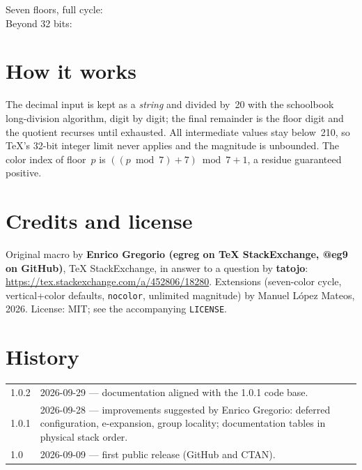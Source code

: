 \documentclass[11pt]{article}
\begin{document}
\begin{center}
\qquad
{}\qquad
{}\qquad
{}
\end{center}

\begin{center}
Seven floors, full cycle: \\[6pt]
Beyond 32 bits: 
\end{center}

\section{How it works}

The decimal input is kept as a \emph{string} and divided by~20 with the
schoolbook long-division algorithm, digit by digit; the final remainder is
the floor digit and the quotient recurses until exhausted. All intermediate
values stay below~210, so TeX's 32-bit integer limit never applies and the
magnitude is unbounded. The color index of floor~$p$ is
$((p \bmod 7)+7) \bmod 7 + 1$, a residue guaranteed positive.

\section{Credits and license}

Original macro by \textbf{Enrico Gregorio (egreg on TeX StackExchange, @eg9 on GitHub)}, TeX StackExchange, in answer to a question
by \textbf{tatojo}: \url{https://tex.stackexchange.com/a/452806/18280}.
Extensions (seven-color cycle, vertical+color defaults, \texttt{nocolor},
unlimited magnitude) by Manuel López Mateos, 2026.
License: MIT; see the accompanying \texttt{LICENSE}.

\section{History}

\begin{tabular}{ll}
1.0.2 & 2026-09-29 --- documentation aligned with the 1.0.1 code base.\\
1.0.1 & 2026-09-28 --- improvements suggested by Enrico Gregorio:
        deferred configuration, e-expansion, group locality;
        documentation tables in physical stack order.\\
1.0   & 2026-09-09 --- first public release (GitHub and CTAN).\\
\end{tabular}
\end{document}

